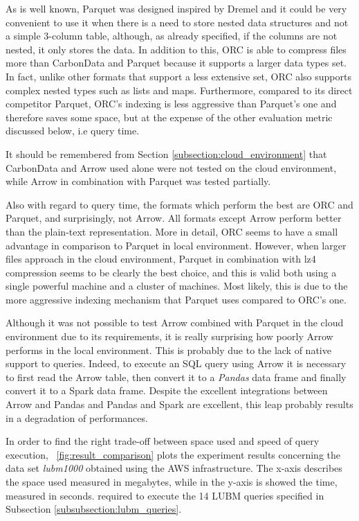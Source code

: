 \documentclass[10pt, a4paper]{report}
\begin{document}
As is well known, Parquet was designed inspired by Dremel\cite{dremel_paper} and it could be very convenient to use it when there is a need to store nested data structures and not a simple 3-column table, although, as already specified, if the columns are not nested, it only stores the data. In addition to this, ORC is able to compress files more than CarbonData and Parquet because it supports a larger data types set. In fact, unlike other formats that support a less extensive set, ORC also supports complex nested types such as lists and maps. Furthermore, compared to its direct competitor Parquet, ORC's indexing is less aggressive than Parquet's one and therefore saves some space, but at the expense of the other evaluation metric discussed below, i.e query time.

It should be remembered from Section \ref{subsection:cloud_environment} that CarbonData and Arrow used alone were not tested on the cloud environment, while Arrow in combination with Parquet was tested partially.

Also with regard to query time, the formats which perform the best are ORC and Parquet, and surprisingly, not Arrow. All formats except Arrow perform better than the plain-text representation. More in detail, ORC seems to have a small advantage in comparison to Parquet in local environment. However, when larger files approach in the cloud environment, Parquet in combination with lz4 compression seems to be clearly the best choice, and this is valid both using a single powerful machine and a cluster of machines. Most likely, this is due to the more aggressive indexing mechanism that Parquet uses compared to ORC's one.

Although it was not possible to test Arrow combined with Parquet in the cloud environment due to its requirements, it is really surprising how poorly Arrow performs in the local environment. This is probably due to the lack of native support to queries. Indeed, to execute an SQL query using Arrow it is necessary to first read the Arrow table, then convert it to a \textit{Pandas}\cite{pandas} data frame and finally convert it to a Spark data frame. Despite the excellent integrations between Arrow and Pandas and Pandas and Spark are excellent, this leap probably results in a degradation of performances.

In order to find the right trade-off between space used and speed of query execution, \figurename~\ref{fig:result_comparison} plots the experiment results concerning the data set \textit{lubm1000} obtained using the AWS infrastructure. The x-axis describes the space used measured in megabytes, while in the y-axis is showed the time, measured in seconds. required to execute the 14 LUBM queries specified in Subsection \ref{subsubsection:lubm_queries}.
\end{document}
